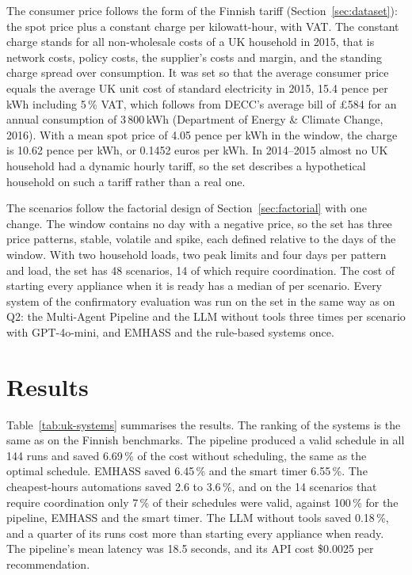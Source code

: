 The consumer price follows the form of the Finnish tariff
(Section~\ref{sec:dataset}): the spot price plus a constant charge per
kilowatt-hour, with VAT. The constant charge stands for all
non-wholesale costs of a UK household in 2015, that is network costs,
policy costs, the supplier's costs and margin, and the standing charge
spread over consumption. It was set so that the average consumer price
equals the average UK unit cost of standard electricity in 2015, 15.4
pence per kWh including 5\,\% VAT, which follows from DECC's average bill
of \pounds 584 for an annual consumption of 3\,800\,kWh (Department of
Energy \& Climate Change, 2016). With a mean spot price of 4.05 pence per
kWh in the window, the charge is 10.62 pence per kWh, or 0.1452 euros
per kWh. In 2014--2015 almost no UK household had a dynamic hourly
tariff, so the set describes a hypothetical household on such a tariff
rather than a real one.

The scenarios follow the factorial design of
Section~\ref{sec:factorial} with one change. The window contains no day
with a negative price, so the set has three price patterns, stable,
volatile and spike, each defined relative to the days of the window.
With two household loads, two peak limits and four days per pattern and
load, the set has 48 scenarios, 14 of which require coordination. The
cost of starting every appliance when it is ready has a median of
 per scenario. Every system of the confirmatory evaluation was
run on the set in the same way as on Q2: the Multi-Agent Pipeline and
the LLM without tools three times per scenario with GPT-4o-mini, and
EMHASS and the rule-based systems once.

\section{Results}

Table~\ref{tab:uk-systems} summarises the results. The ranking of the
systems is the same as on the Finnish benchmarks. The pipeline produced
a valid schedule in all 144 runs and saved 6.69\,\% of the cost without
scheduling, the same as the optimal schedule. EMHASS saved 6.45\,\% and
the smart timer 6.55\,\%. The cheapest-hours automations saved 2.6 to
3.6\,\%, and on the 14 scenarios that require coordination only 7\,\% of
their schedules were valid, against 100\,\% for the pipeline, EMHASS and
the smart timer. The LLM without tools saved 0.18\,\%, and a quarter of
its runs cost more than starting every appliance when ready. The
pipeline's mean latency was 18.5 seconds, and its API cost \$0.0025 per
recommendation.


